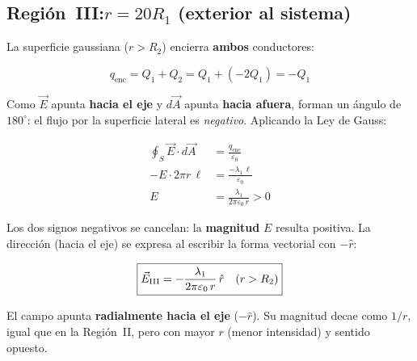 \documentclass[12pt,letterpaper]{article}
\begin{document}
\bigskip

\subsection*{Regi\'on~III:\enspace $r = 20R_1$ \normalfont(exterior al sistema)}

\noindent
\begin{minipage}[c]{0.30\textwidth}
\centering
{}
\end{minipage}%
\hfill
\begin{minipage}[c]{0.67\textwidth}
La superficie gaussiana ($r > R_2$) encierra \textbf{ambos} conductores:

\[
    q_\text{enc} = Q_1 + Q_2 = Q_1 + (-2Q_1) = -Q_1
\]

Como $\vec{E}$ apunta \textbf{hacia el eje} y $d\vec{A}$ apunta
\textbf{hacia afuera}, forman un \'angulo de $180^{\circ}$: el flujo por la
superficie lateral es \emph{negativo}.
Aplicando la Ley de Gauss:

\begin{align*}
    \oint_S \vec{E}\cdot d\vec{A}
        &= \frac{q_\text{enc}}{\varepsilon_0} \\[6pt]
    -E\cdot 2\pi r\,\ell
        &= \frac{-\lambda_1\,\ell}{\varepsilon_0} \\[6pt]
    E   &= \frac{\lambda_1}{2\pi\varepsilon_0\,r} > 0
\end{align*}

Los dos signos negativos se cancelan: la \textbf{magnitud} $E$ resulta
positiva. La direcci\'on (hacia el eje) se expresa al escribir la forma
vectorial con $-\hat{r}$:

\[
    \boxed{%
        \vec{E}_\text{III}
        = -\frac{\lambda_1}{2\pi\varepsilon_0\,r}\,\hat{r}
        \quad (r > R_2)
    }
\]

El campo apunta \textbf{radialmente hacia el eje} ($-\hat{r}$). Su
magnitud decae como $1/r$, igual que en la Regi\'on~II, pero con
mayor $r$ (menor intensidad) y sentido opuesto.
\end{minipage}
\end{document}
